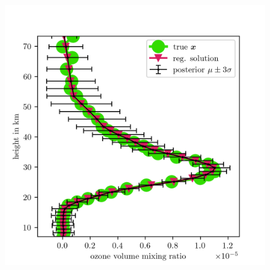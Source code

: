\begin{figure}[ht!]
	\centering
	\includegraphics{SecRecResinclReg.png}
	\caption[]{}
	\label{fig:}
\end{figure}




